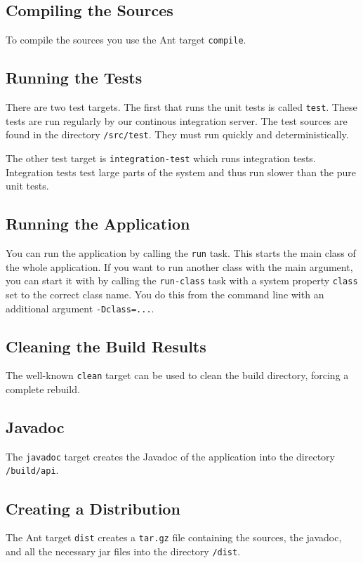 \documentclass[11pt,a4paper]{article}
\begin{document}
\subsection{Compiling the Sources}
To compile the sources you use the Ant target \texttt{compile}. 

\subsection{Running the Tests}
There are two test targets. The first that runs the unit tests is called
\texttt{test}. These tests are run regularly by our continous integration
server. The test sources are found in the directory \texttt{/src/test}. They
must run quickly and deterministically.

The other test target is \texttt{integration-test} which runs integration tests.
Integration tests test large parts of the system and thus run slower than
the pure unit tests.

\subsection{Running the Application}
You can run the application by calling the \texttt{run} task. This starts
the main class of the whole application. If you want to run another class
with the main argument, you can start it with by calling the \texttt{run-class}
task with a system property \texttt{class} set to the correct class name.
You do this from the command line with an additional argument 
\texttt{-Dclass=...}.

\subsection{Cleaning the Build Results}
The well-known \texttt{clean} target can be used to clean the build directory,
forcing a complete rebuild.

\subsection{Javadoc}
The \texttt{javadoc} target creates the Javadoc of the application into the
directory \texttt{/build/api}.

\subsection{Creating a Distribution}
The Ant target \texttt{dist} creates a \texttt{tar.gz} file containing the
sources, the javadoc, and all the necessary jar files into the directory
\texttt{/dist}.
\end{document}
